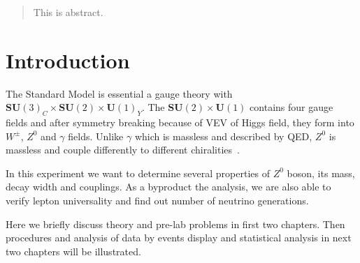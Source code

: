 \begin{abstract}
	This is abstract.
\end{abstract}
\section{Introduction}
The Standard Model is essential a gauge theory with $\mathbf{SU}(3)_C \times \mathbf{SU}(2) \times \mathbf{U}(1)_Y$. The $\mathbf{SU}(2) \times \mathbf{U}(1)$ contains four gauge fields and after symmetry breaking because of VEV of Higgs field, they form into $W^{\pm}$, $Z^0$ and $\gamma$ fields. Unlike $\gamma$ which is massless and described by QED, $Z^0$ is massless and couple differently to different chiralities~\cite{Tapei}.

In this experiment we want to determine several properties of $Z^0$ boson, its mass, decay width and couplings. As a byproduct the analysis, we are also able to verify lepton universality and find out number of neutrino generations.

Here we briefly discuss theory and pre-lab problems in first two chapters. Then procedures and analysis of data by events display and statistical analysis in next two chapters will be illustrated. 

